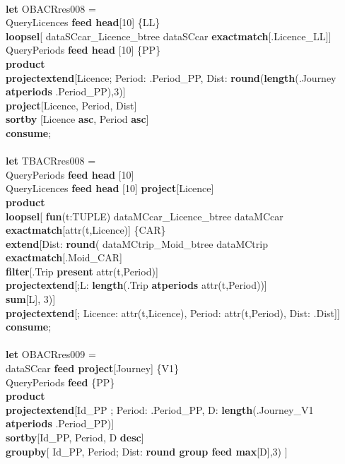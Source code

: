 \documentclass[a4paper]{article}
\newcommand{\op}[1]{\textbf{#1}}
\begin{document}
\begin{scriptsize}
\begin{tabbing}
\\
\op{let} OBACRres008 =\\
\>QueryLicences \op{feed head}[10] \{LL\}\\
\>\op{loopsel}[ dataSCcar\_Licence\_btree dataSCcar \op{exactmatch}[.Licence\_LL]]\\
\>QueryPeriods \op{feed head} [10] \{PP\}\\
\>\op{product}\\
\>\op{projectextend}[Licence; Period: .Period\_PP, Dist: \op{round}(\op{length}(.Journey \op{atperiods} .Period\_PP),3)]\\
\>\op{project}[Licence, Period, Dist]\\
\>\op{sortby} [Licence \op{asc}, Period \op{asc}]\\
\op{consume};\\
\\
\op{let} TBACRres008 =\\
\>QueryPeriods \op{feed head} [10]\\
\>QueryLicences \op{feed head} [10] \op{project}[Licence]\\
\>\op{product}\\
\>\op{loopsel}[ \op{fun}(t:TUPLE)    dataMCcar\_Licence\_btree dataMCcar \op{exactmatch}[attr(t,Licence)] \{CAR\}\\
\>\>\op{extend}[Dist: \op{round}(
\>\>\>\>dataMCtrip\_Moid\_btree dataMCtrip \op{exactmatch}[.Moid\_CAR]\\
\>\>\>\>\op{filter}[.Trip \op{present} attr(t,Period)]\\
\>\>\>\>\op{projectextend}[;L: \op{length}(.Trip \op{atperiods} attr(t,Period))]\\
\>\>\>\op{sum}[L], 3)]\\
\>\>\op{projectextend}[; Licence: attr(t,Licence), Period: attr(t,Period), Dist: .Dist]]\\
\op{consume};\\
\\
\op{let} OBACRres009 =\\
\>dataSCcar \op{feed project}[Journey] \{V1\}\\
\>QueryPeriods \op{feed} \{PP\}\\
\>\op{product}\\
\>\op{projectextend}[Id\_PP ; Period: .Period\_PP, D: \op{length}(.Journey\_V1 \op{atperiods} .Period\_PP)]\\
\>\op{sortby}[Id\_PP, Period, D \op{desc}]\\
\>\op{groupby}[ Id\_PP, Period; Dist: \op{round group feed max}[D],3) ]\\

\end{tabbing}
\end{scriptsize}
\end{document}
